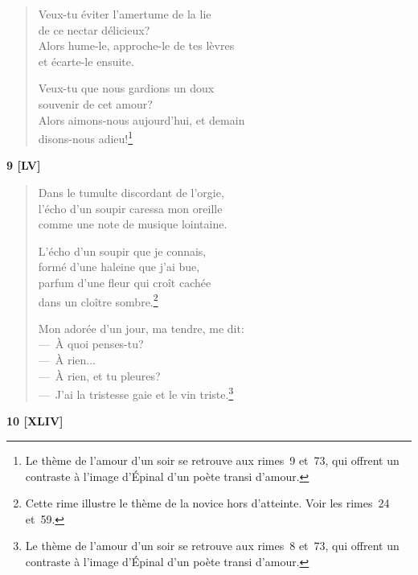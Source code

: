 \begin{verse}
  Veux-tu éviter l'amertume de la lie \\
  de ce nectar délicieux? \\
  Alors hume-le, approche-le de tes lèvres \\
  et écarte-le ensuite.

  Veux-tu que nous gardions un doux \\
  souvenir de cet amour? \\
  Alors aimons-nous aujourd'hui, et demain \\
  disons-nous adieu!\footnote{Le thème de l'amour d'un soir se
  retrouve aux rimes~9 et~73, qui offrent un contraste à l'image
  d'Épinal d'un poète transi d'amour.}
\end{verse}

\pagebreak

\begin{center}
  \textbf{9 [LV]}
\end{center}

\begin{verse}
  Dans le tumulte discordant de l'orgie, \\
  l'écho d'un soupir caressa mon oreille \\
  comme une note de musique lointaine.

  L'écho d'un soupir que je connais, \\
  formé d'une haleine que j'ai bue, \\
  parfum d'une fleur qui croît cachée \\
  dans un cloître sombre.\footnote{Cette rime illustre le thème de la
  novice hors d'atteinte. Voir les rimes~24 et~59.}

  Mon adorée d'un jour, ma tendre, me dit: \\
  ---~À quoi penses-tu? \\
  ---~À rien... \\
  ---~À rien, et tu pleures? \\
  ---~J'ai la tristesse gaie et le vin triste.\footnote{Le thème de l'amour d'un soir se
  retrouve aux rimes~8 et~73, qui offrent un contraste à l'image
  d'Épinal d'un poète transi d'amour.}
\end{verse}

\bigskip

\begin{center}
  \textbf{10 [XLIV]}
\end{center}

